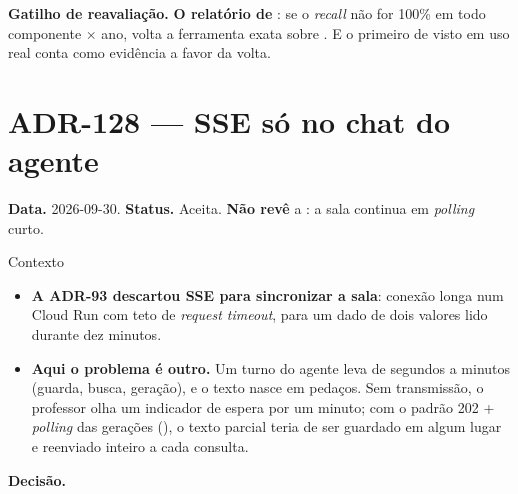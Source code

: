 \textbf{Gatilho de reavaliação.} \textbf{O relatório de
}: se o \emph{recall}
não for 100\% em todo componente $\times$ ano, volta a ferramenta exata sobre
. E o primeiro  de  visto
em uso real conta como evidência a favor da volta.

\section{ADR-128 --- SSE só no chat do agente}
\label{adr:agente-professor-sse}

\textbf{Data.} 2026-09-30. \textbf{Status.} Aceita. \textbf{Não revê} a
: a sala continua em \emph{polling} curto.

\begin{especificacao}{Contexto}
\begin{itemize}
  \item \textbf{A ADR-93 descartou SSE para sincronizar a sala}: conexão longa
    num Cloud Run com teto de \emph{request timeout}, para um dado de dois
    valores lido durante dez minutos.
  \item \textbf{Aqui o problema é outro.} Um turno do agente leva de segundos a
    minutos (guarda, busca, geração), e o texto nasce em pedaços. Sem
    transmissão, o professor olha um indicador de espera por um minuto; com o
    padrão 202 + \emph{polling} das gerações (), o texto parcial
    teria de ser guardado em algum lugar e reenviado inteiro a cada consulta.
\end{itemize}
\end{especificacao}

\textbf{Decisão.}

